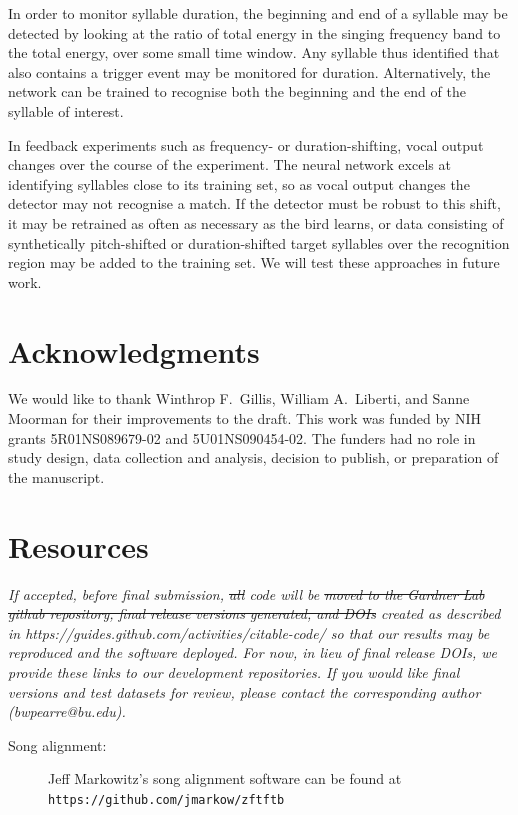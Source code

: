 \documentclass[10pt,letterpaper]{article}
\let\oldmarginpar\marginpar
\renewcommand{\marginpar}[1]{\oldmarginpar{\linespread{1}\scriptsize{#1}}}
\providecommand{\DIFaddtex}[1]{{\protect\color{blue}\uwave{#1}}} %
\providecommand{\DIFdeltex}[1]{{\protect\color{red}\sout{#1}}}                      %
\providecommand{\DIFaddbegin}{} %
\providecommand{\DIFaddend}{} %
\providecommand{\DIFdelbegin}{} %
\providecommand{\DIFdelend}{} %
\providecommand{\DIFadd}[1]{\texorpdfstring{\DIFaddtex{#1}}{#1}} %
\providecommand{\DIFdel}[1]{\texorpdfstring{\DIFdeltex{#1}}{}} %
\begin{document}
In order to monitor syllable duration, the beginning and end of a
syllable may be detected by looking at the ratio of total energy in
the singing frequency band to the total energy, over some small time
window.  Any syllable thus identified that also contains a trigger
event may be monitored for duration.  Alternatively, the network can
be trained to recognise both the beginning and the end of the syllable
of interest.

In feedback experiments such as frequency- or duration-shifting, vocal
output changes over the course of the experiment.  The neural network
excels at identifying syllables close to its training set, so as vocal
output changes the detector may not recognise a match.  If the
detector must be robust to this shift, it may be retrained as often as
necessary as the bird learns, or data consisting of synthetically
pitch-shifted or duration-shifted target syllables over the
recognition region may be added to the training set.  We will test
these approaches in future work.

\section{Acknowledgments}
We would like to thank Winthrop F.~Gillis, William A.~Liberti, and Sanne Moorman for
their improvements to the draft.  This work was funded by NIH grants
5R01NS089679-02 and 5U01NS090454-02.  The funders had no role in study design, data collection and analysis, decision to publish, or preparation of the manuscript.

\appendix

\section{Resources}
\label{sec:resources}

{\em If accepted, before final submission, \DIFdelbegin \DIFdel{all }\DIFdelend \DIFaddbegin \DIFadd{DOIs for the latest }\DIFaddend code will be \DIFdelbegin \DIFdel{moved to the Gardner Lab github repository, final release versions generated, and DOIs }\DIFdelend created as described in https://guides.github.com/activities/citable-code/ so that our results may be reproduced and the software deployed.  For now, in lieu of final release DOIs, we provide these links to our development repositories.  If you would like final versions and test datasets for review, please contact the corresponding author (bwpearre@bu.edu).}
 \begin{description} 
  \item[Song alignment:] Jeff Markowitz's song alignment software \cite{Poole2012} can be found at
    {\tt https://github.com/jmarkow/zftftb}
 \end{description} 
\end{document}
